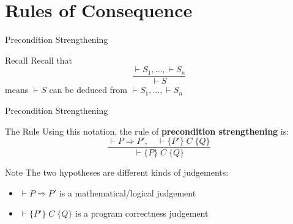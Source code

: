 \section{Rules of Consequence}

\begin{frame}{Precondition Strengthening}
    \begin{block}{Recall}
        Recall that
        \[ \frac{\vdash S_1, \ldots, \vdash S_n}{\vdash S} \]
        means $\vdash S$ can be deduced from $\vdash S_1, \ldots, \vdash S_n$
    \end{block}

\end{frame}

\begin{frame}{Precondition Strengthening}
    \begin{block}{The Rule}
        Using this notation, the rule of \textbf{precondition strengthening} is:
        \[ \frac{\vdash P \Rightarrow P', \quad \vdash \{P'\} \; C \; \{Q\}}{\vdash \{P\} \; C \; \{Q\}} \]
    \end{block}
    \begin{alertblock}{Note}
        The two hypotheses are different kinds of judgements:
        \begin{itemize}
            \item $\vdash P \Rightarrow P'$ is a mathematical/logical judgement
            \item $\vdash \{P'\} \; C \; \{Q\}$ is a program correctness judgement
        \end{itemize}
    \end{alertblock}
\end{frame}

